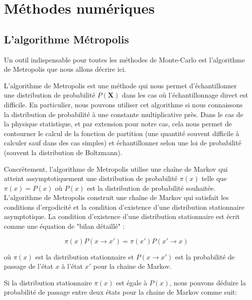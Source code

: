 \documentclass[11pt]{article}
\theoremstyle{definition}
\theoremstyle{remark}
\begin{document}
\section{Méthodes numériques}\label{sec:num}
\subsection{L'algorithme Métropolis}\label{ssec:metropolis}

Un outil indispensable pour toutes les méthodes de Monte-Carlo est l'algorithme de Metropolis que nous allons décrire ici. 

L'algorithme de Metropolis est une méthode qui nous permet d'échantillonner une distribution de probabilité $P(\mathbf{X})$ dans les cas où l’échantillonnage direct est difficile. En particulier, nous pouvons utiliser cet algorithme si nous connaissons la distribution de probabilité à une constante multiplicative près. Dans le cas de la physique statistique, et par extension pour notre cas, cela nous permet de contourner le calcul de la fonction de partition (une quantité souvent difficile à calculer sauf dans des cas simples) et échantillonner selon une loi de probabilité (souvent la distribution de Boltzmann).

Concrètement, l'algorithme de Metropolis utilise une chaîne de Markov qui atteint assymptotiquement une distribution de probabilité $\pi(x)$ telle que $\pi(x) = P(x)$ où $P(x)$ est la distribution de probabilité souhaitée. L'algorithme de Metropolis construit une chaîne de Markov qui satisfait les conditions d'ergodicité et la condition d'existence d'une distribution stationnaire asymptotique. La condition d'existence d'une distribution stationnaire est écrit comme une équation de "bilan détaillé" :

\begin{equation}
\label{detailed_balance}
\pi(x) P(x \rightarrow x') = \pi(x') P(x' \rightarrow x)
\end{equation} 

où $\pi(x)$ est la distribution stationnaire et $P(x \rightarrow x')$ est la probabilité de passage de l'état $x$ à l'état $x'$ pour la chaine de Markov.  

Si la distribution stationnaire $\pi(x)$ est égale à $P(x)$, nous pouvons déduire la probabilité de passage entre deux états pour la chaine de Markov comme suit: 
\end{document}
